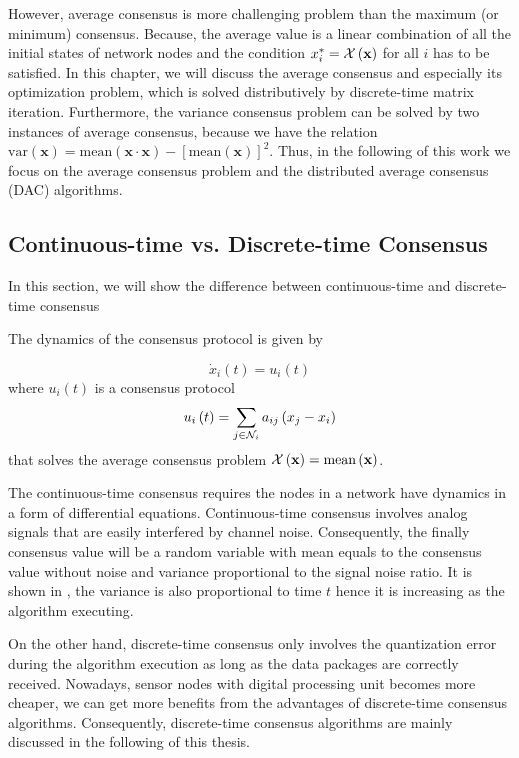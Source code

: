 However, average consensus is more challenging problem than the maximum
(or minimum) consensus. Because, the average value is a linear combination
of all the initial states of network nodes and the condition $x_{i}^{*}={\cal X}\left(\mathbf{x}\right)$
for all $i$ has to be satisfied. In this chapter, we will discuss
the average consensus and especially its optimization problem, which
is solved distributively by discrete-time matrix iteration. Furthermore,
the variance consensus problem can be solved by two instances of average
consensus, because we have the relation $\mbox{var}\left(\mathbf{x}\right)=\mbox{mean}\left(\mathbf{x}\cdot\mathbf{x}\right)-\left[\mbox{mean}\left(\mathbf{x}\right)\right]^{2}$.
Thus, in the following of this work we focus on the average consensus
problem and the distributed average consensus (DAC) algorithms. 


\subsection{Continuous-time vs. Discrete-time Consensus}

In this section, we will show the difference between continuous-time
and discrete-time consensus 

The dynamics of the consensus protocol is given by 

\begin{equation}
\dot{x}_{i}\left(t\right)=u_{i}\left(t\right)\label{eq:continuous_time_consensus}
\end{equation}
where $u_{i}\left(t\right)$ is a consensus protocol 
\begin{equation}
u_{i}\left(t\right)=\sum_{j\in{\cal N}_{i}}a_{ij}\left(x_{j}-x_{i}\right)\label{eq:1st Order Protocol}
\end{equation}
that solves the average consensus problem ${\cal X}\left(\mathbf{x}\right)=\mbox{mean}\left(\mathbf{x}\right)$. 

The continuous-time consensus requires the nodes in a network have
dynamics in a form of differential equations. Continuous-time consensus
involves analog signals that are easily interfered by channel noise.
Consequently, the finally consensus value will be a random variable
with mean equals to the consensus value without noise and variance
proportional to the signal noise ratio. It is shown in \cite{Kar2009},
the variance is also proportional to time $t$ hence it is increasing
as the algorithm executing. 



On the other hand, discrete-time consensus only involves the quantization
error during the algorithm execution as long as the data packages
are correctly received.  Nowadays, sensor nodes with digital processing
unit becomes more cheaper, we can get more benefits from the advantages
of discrete-time consensus algorithms. Consequently, discrete-time
consensus algorithms are mainly discussed in the following of this
thesis. 



